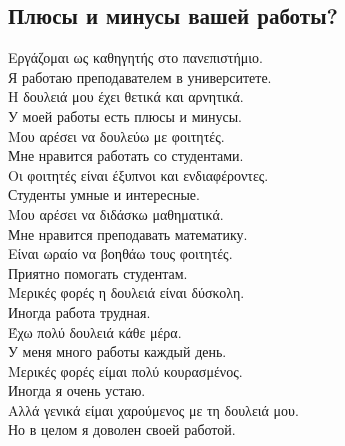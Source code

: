 \documentclass[12pt]{article}
\newcommand{\my}[1]{\textcolor{gray!80!white}{#1}}
\newenvironment{page}{\clearpage\normalsize\null\vfill}{\vfill\null}
\newenvironment{textblock}{\begin{minipage}{\textwidth}}{\end{minipage}\smallskip}
\begin{document}
	\begin{page}
		\subsection{Плюсы и минусы вашей работы?}
        \small
		\begin{textblock}
			Εργάζομαι ως καθηγητής στο πανεπιστήμιο.\\
            \my{Я работаю преподавателем в университете.}\\
			Η δουλειά μου έχει θετικά και αρνητικά.\\
            \my{У моей работы есть плюсы и минусы.}\\
			Μου αρέσει να δουλεύω με φοιτητές.\\
            \my{Мне нравится работать со студентами.}\\
			Οι φοιτητές είναι έξυπνοι και ενδιαφέροντες.\\
            \my{Студенты умные и интересные.}\\
			Μου αρέσει να διδάσκω μαθηματικά.\\
            \my{Мне нравится преподавать математику.}\\
			Είναι ωραίο να βοηθάω τους φοιτητές.\\
            \my{Приятно помогать студентам.}\\
			Μερικές φορές η δουλειά είναι δύσκολη.\\
            \my{Иногда работа трудная.}\\
			Έχω πολύ δουλειά κάθε μέρα.\\
            \my{У меня много работы каждый день.}\\
			Μερικές φορές είμαι πολύ κουρασμένος.\\
            \my{Иногда я очень устаю.}\\
			Αλλά γενικά είμαι χαρούμενος με τη δουλειά μου.\\
            \my{Но в целом я доволен своей работой.}\\
		\end{textblock}
	\end{page}
	
\end{document}
